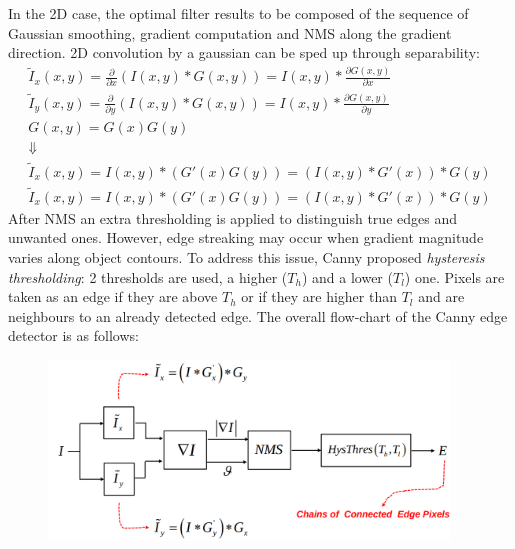 \documentclass{article}
\begin{document}
In the 2D case, the optimal filter results to be composed of the sequence of Gaussian smoothing, gradient computation and NMS along the gradient direction. 
2D convolution by a gaussian can be sped up through separability:
\begin{gather*}
    \tilde{I}_x(x,y) = \frac{\partial}{\partial x} (I(x,y)\ast G(x,y)) = I(x,y) \ast \frac{\partial G(x,y)}{\partial x}\\
    \tilde{I}_y(x,y) = \frac{\partial}{\partial y} (I(x,y)\ast G(x,y)) = I(x,y) \ast \frac{\partial G(x,y)}{\partial y}\\
    G(x,y) = G(x)G(y)\\
    \Downarrow\\
    \tilde{I}_x(x,y) = I(x,y) \ast (G'(x)G(y))  =(I(x,y)\ast G'(x))\ast G(y)\\
    \tilde{I}_x(x,y) = I(x,y) \ast (G'(x)G(y))=(I(x,y)\ast G'(x))\ast G(y)
\end{gather*}
After NMS an extra thresholding is applied to distinguish true edges and unwanted ones. However, edge streaking may occur when gradient magnitude varies along object contours. To address this issue, Canny proposed \emph{hysteresis thresholding}: 2 thresholds are used, a higher ($T_h$) and a lower ($T_l$) one. Pixels are taken as an edge if they are above $T_h$ or if they are higher than $T_l$ and are neighbours to an already detected edge. The overall flow-chart of the Canny edge detector is as follows:
\begin{figure}[!ht]
    \begin{center}
        \includegraphics[width=0.95\textwidth]{canny}
    \end{center}
    \label{fig:canny}
\end{figure}
\end{document}
